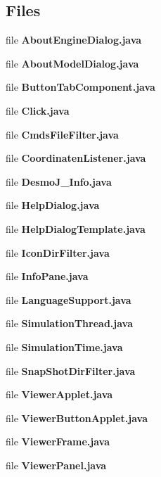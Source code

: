 \subsection*{Files}
\begin{DoxyCompactItemize}
\item 
file {\bfseries About\-Engine\-Dialog.\-java}
\item 
file {\bfseries About\-Model\-Dialog.\-java}
\item 
file {\bfseries Button\-Tab\-Component.\-java}
\item 
file {\bfseries Click.\-java}
\item 
file {\bfseries Cmds\-File\-Filter.\-java}
\item 
file {\bfseries Coordinaten\-Listener.\-java}
\item 
file {\bfseries Desmo\-J\-\_\-\-Info.\-java}
\item 
file {\bfseries Help\-Dialog.\-java}
\item 
file {\bfseries Help\-Dialog\-Template.\-java}
\item 
file {\bfseries Icon\-Dir\-Filter.\-java}
\item 
file {\bfseries Info\-Pane.\-java}
\item 
file {\bfseries Language\-Support.\-java}
\item 
file {\bfseries Simulation\-Thread.\-java}
\item 
file {\bfseries Simulation\-Time.\-java}
\item 
file {\bfseries Snap\-Shot\-Dir\-Filter.\-java}
\item 
file {\bfseries Viewer\-Applet.\-java}
\item 
file {\bfseries Viewer\-Button\-Applet.\-java}
\item 
file {\bfseries Viewer\-Frame.\-java}
\item 
file {\bfseries Viewer\-Panel.\-java}
\end{DoxyCompactItemize}
